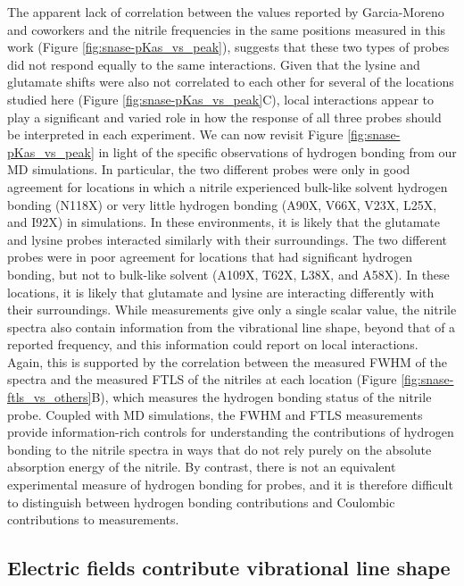 The apparent lack of correlation between the \dpKa{} values reported by Garcia-Moreno and coworkers and the nitrile frequencies in the same positions measured in this work (Figure \ref{fig:snase-pKas_vs_peak}), suggests that these two types of probes did not respond equally to the same interactions. 
Given that the lysine and glutamate \pKa{} shifts were also not correlated to each other for several of the locations studied here (Figure \ref{fig:snase-pKas_vs_peak}C), local interactions appear to play a significant and varied role in how the response of all three probes should be interpreted in each experiment. 
We can now revisit Figure \ref{fig:snase-pKas_vs_peak} in light of the specific observations of hydrogen bonding from our MD simulations. 
In particular, the two different \pKa{} probes were only in good agreement for locations in which a nitrile experienced bulk-like solvent hydrogen bonding (N118X) or very little hydrogen bonding (A90X, V66X, V23X, L25X, and I92X) in simulations. 
In these environments, it is likely that the glutamate and lysine \pKa{} probes interacted similarly with their surroundings. 
The two different \pKa{} probes were in poor agreement for locations that had significant hydrogen bonding, but not to bulk-like solvent (A109X, T62X, L38X, and A58X). 
In these locations, it is likely that glutamate and lysine are interacting differently with their surroundings. 
While \dpKa{} measurements give only a single scalar value, the nitrile spectra also contain information from the vibrational line shape, beyond that of a reported frequency, and this information could report on local interactions. 
Again, this is supported by the correlation between the measured FWHM of the spectra and the measured FTLS of the nitriles at each location (Figure \ref{fig:snase-ftls_vs_others}B), which measures the hydrogen bonding status of the nitrile probe. 
Coupled with MD simulations, the FWHM and FTLS measurements provide information-rich controls for understanding the contributions of hydrogen bonding to the nitrile spectra in ways that do not rely purely on the absolute absorption energy of the nitrile. 
By contrast, there is not an equivalent experimental measure of hydrogen bonding for \pKa{} probes, and it is therefore difficult to distinguish between hydrogen bonding contributions and Coulombic contributions to \dpKa{} measurements.

\subsection{Electric fields contribute vibrational line shape}

